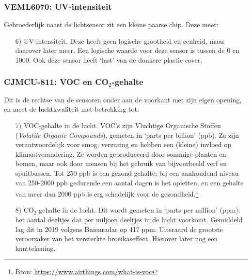 \documentclass[a4paper,11pt, fleqn]{article}
\begin{document}
\subsubsection{VEML6070: UV-intensiteit}
Gebroederlijk naast de lichtsensor zit een kleine paarse chip. Deze meet:
\begin{itemize}
	\item[6)] UV-intensiteit. Deze heeft geen logische grootheid en eenheid, maar daarover later meer. Een logische waarde voor deze sensor is tussen de 0 en 1000. Ook deze sensor heeft `last' van de donkere plastic cover.
\end{itemize}

\subsubsection{CJMCU-811: VOC en CO$_2$-gehalte}
Dit is de rechtse van de sensoren onder aan de voorkant met zijn eigen opening, en meet de luchtkwaliteit met betrekking tot:
\begin{itemize}
	\item[7)] VOC-gehalte in de lucht. VOC's zijn Vluchtige Organische Stoffen ({\it Volatile Organic Compounds}), gemeten in `parts per billion' (ppb). Ze zijn verantwoordelijk voor smog, verzuring en hebben een (kleine) invloed op klimaatverandering. Ze worden geproduceerd door sommige planten en bomen, maar ook door mensen bij het gebruik van bijvoorbeeld verf en spuitbussen. Tot 250 ppb is een gezond gehalte; bij een aanhoudend niveau van 250-2000 ppb gedurende een aantal dagen is het opletten, en een gehalte van meer dan 2000 ppb is erg schadelijk voor de gezondheid.\footnote{Bron: \href{https://www.airthings.com/what-is-voc}{https://www.airthings.com/what-is-voc}}
	\item[8)] CO$_2$-gehalte in de lucht. Dit wordt gemeten in `parts per million' (ppm): het aantal deeltjes dat per miljoen deeltjes in de lucht voorkomt. Gemiddeld lag dit in 2019 volgens Buienradar op 417 ppm. Uiteraard de grootste veroorzaker van het versterkte broeikaseffect. Hierover later nog een kanttekening.
\end{itemize}
\end{document}
